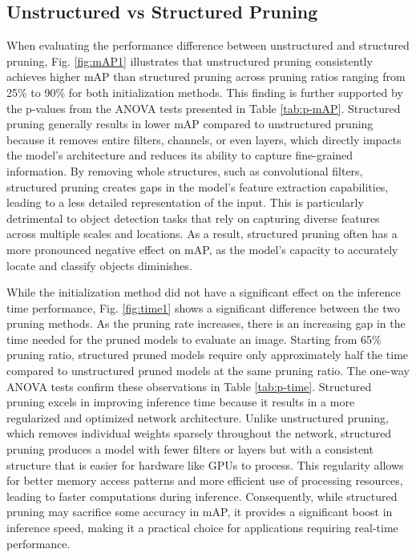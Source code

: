 \documentclass[journal,onecolumn,12pt]{IEEEtran}
\begin{document}
\subsection{Unstructured vs Structured Pruning}
\label{sec2}
When evaluating the performance difference between unstructured and structured pruning, Fig. \ref{fig:mAP1} illustrates that unstructured pruning consistently achieves higher mAP than structured pruning across pruning ratios ranging from 25\% to 90\% for both initialization methods. This finding is further supported by the p-values from the ANOVA tests presented in Table \ref{tab:p-mAP}. Structured pruning generally results in lower mAP compared to unstructured pruning because it removes entire filters, channels, or even layers, which directly impacts the model’s architecture and reduces its ability to capture fine-grained information. By removing whole structures, such as convolutional filters, structured pruning creates gaps in the model’s feature extraction capabilities, leading to a less detailed representation of the input. This is particularly detrimental to object detection tasks that rely on capturing diverse features across multiple scales and locations. As a result, structured pruning often has a more pronounced negative effect on mAP, as the model’s capacity to accurately locate and classify objects diminishes.

While the initialization method did not have a significant effect on the inference time performance, Fig. \ref{fig:time1} shows a significant difference between the two pruning methods. As the pruning rate increases, there is an increasing gap in the time needed for the pruned models to evaluate an image. Starting from 65\% pruning ratio, structured pruned models require only approximately half the time compared to unstructured pruned models at the same pruning ratio. The one-way ANOVA tests confirm these observations in Table \ref{tab:p-time}. Structured pruning excels in improving inference time because it results in a more regularized and optimized network architecture. Unlike unstructured pruning, which removes individual weights sparsely throughout the network, structured pruning produces a model with fewer filters or layers but with a consistent structure that is easier for hardware like GPUs to process. This regularity allows for better memory access patterns and more efficient use of processing resources, leading to faster computations during inference. Consequently, while structured pruning may sacrifice some accuracy in mAP, it provides a significant boost in inference speed, making it a practical choice for applications requiring real-time performance.
\end{document}
